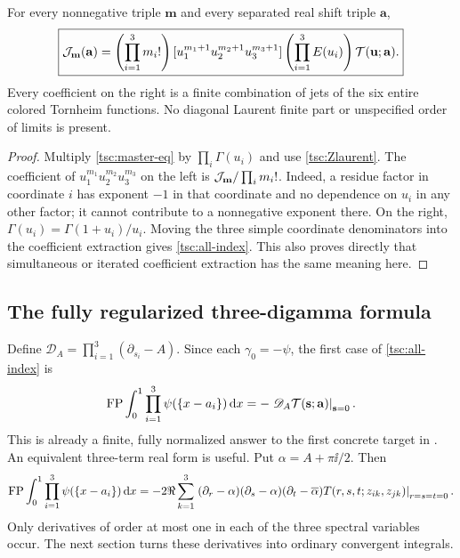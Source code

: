 \begin{theorem}\label{tsc:stieltjes-triple}
For every nonnegative triple $\mathbf m$ and every separated real shift
triple $\mathbf a$,
\begin{equation}\label{tsc:all-index}
 \boxed{\displaystyle
 \mathcal J_{\mathbf m}(\mathbf a)=
  \left(\prod_{i=1}^3m_i!\right)
  [u_1^{m_1+1}u_2^{m_2+1}u_3^{m_3+1}]
       \left(\prod_{i=1}^3E(u_i)\right)\mathcal T(\mathbf u;\mathbf a).}
\end{equation}
Every coefficient on the right is a finite combination of jets of the six
entire colored Tornheim functions. No diagonal Laurent finite part or
unspecified order of limits is present.
\end{theorem}
\begin{proof}
Multiply \eqref{tsc:master-eq} by $\prod_i\Gamma(u_i)$ and use
\eqref{tsc:Zlaurent}. The coefficient of
$u_1^{m_1}u_2^{m_2}u_3^{m_3}$ on the left is
$\mathcal J_{\mathbf m}/\prod_i m_i!$. Indeed, a residue factor in coordinate
$i$ has exponent $-1$ in that coordinate and no dependence on $u_i$ in
any other factor; it cannot contribute to a nonnegative exponent there.
On the right, $\Gamma(u_i)=\Gamma(1+u_i)/u_i$. Moving the three simple
coordinate denominators into the coefficient extraction gives
\eqref{tsc:all-index}. This also proves directly that simultaneous or
iterated coefficient extraction has the same meaning here.
\end{proof}

\subsection{The fully regularized three-digamma formula}
Define $\mathscr D_A=\prod_{i=1}^3(\partial_{s_i}-A)$. Since each
$\gamma_0=-\psi$, the first case of \eqref{tsc:all-index} is
\begin{equation}\label{tsc:digamma-operator}
 \operatorname{FP}\int_0^1\prod_{i=1}^3\psi(\{x-a_i\})\,\mathrm d x
       =-\left.\mathscr D_A\mathcal T(\mathbf s;\mathbf a)\right|_{\mathbf s=0}.
\end{equation}
This is already a finite, fully normalized answer to the first concrete
target in \cite{tsc:shj}. An equivalent three-term real form is useful.
Put $\alpha=A+\pi\ii/2$. Then
\begin{align}\label{tsc:digamma-three}
 \operatorname{FP}\int_0^1\prod_{i=1}^3\psi(\{x-a_i\})\,\mathrm d x
 =-2\Re\sum_{k=1}^3
 \left.(\partial_r-\alpha)(\partial_s-\alpha)
       (\partial_t-\overline\alpha)
       T(r,s,t;z_{ik},z_{jk})\right|_{r=s=t=0}.
\end{align}
Only derivatives of order at most one in each of the three spectral
variables occur. The next section turns these derivatives into ordinary
convergent integrals.

